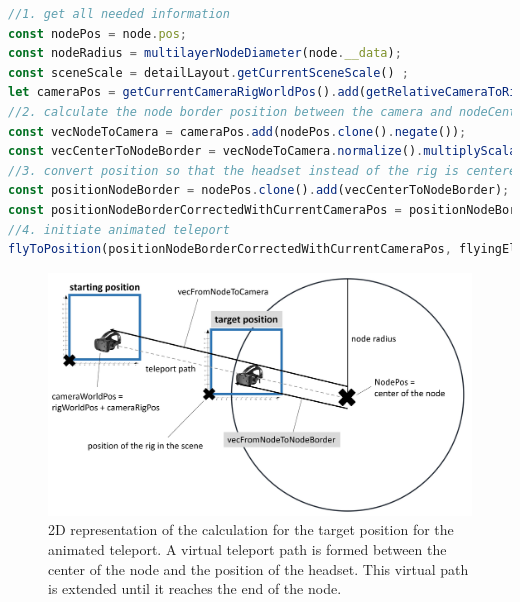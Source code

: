 \begin{lstlisting}[language=JavaScript,label={lst:calculationFlyToNode},caption=Matrix calculations for determining the target position of the animated teleport.]
//1. get all needed information
const nodePos = node.pos;
const nodeRadius = multilayerNodeDiameter(node.__data);
const sceneScale = detailLayout.getCurrentSceneScale() ;
let cameraPos = getCurrentCameraRigWorldPos().add(getRelativeCameraToRigPos());
//2. calculate the node border position between the camera and nodeCenter
const vecNodeToCamera = cameraPos.add(nodePos.clone().negate());
const vecCenterToNodeBorder = vecNodeToCamera.normalize().multiplyScalar(nodeRadius*0.95*sceneScale);//*0.95 as we want to be slightly inside the selected node
//3. convert position so that the headset instead of the rig is centered
const positionNodeBorder = nodePos.clone().add(vecCenterToNodeBorder);
const positionNodeBorderCorrectedWithCurrentCameraPos = positionNodeBorder.clone().add(getRelativeCameraToRigPos().negate());
//4. initiate animated teleport
flyToPosition(positionNodeBorderCorrectedWithCurrentCameraPos, flyingElement);
\end{lstlisting}
\begin{figure}[h]
    \centering
    \includegraphics[width=1\textwidth]{graphics/flyToNodePositionCalc.jpg}
    \caption{2D representation of the calculation for the target position for the animated teleport. A virtual teleport path is formed between the center of the node and the position of the headset. This virtual path is extended until it reaches the end of the node.} 
    \label{fig:vrFlyToNode} 
\end{figure}

